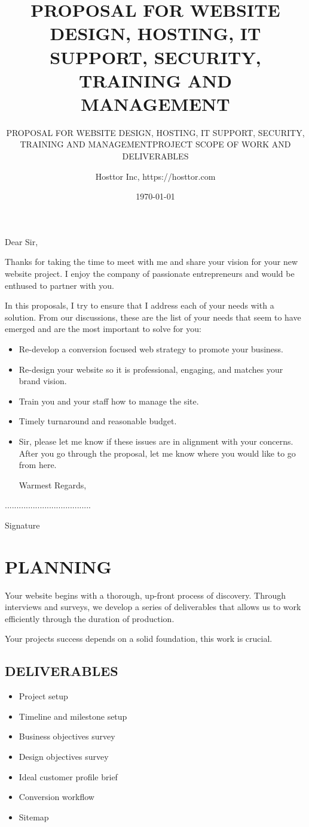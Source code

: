\documentclass[12pt]{report}
\title{PROPOSAL FOR WEBSITE DESIGN, HOSTING, IT SUPPORT, SECURITY, TRAINING AND MANAGEMENT}
\author{Hosttor Inc, https://hosttor.com}
\date{\today}
\begin{document}
\subtitle{PROPOSAL FOR WEBSITE DESIGN, HOSTING, IT SUPPORT, SECURITY, TRAINING AND MANAGEMENT}
\item Dear Sir,
\item Thanks for taking the time to meet with me and share your vision for your new website project. I enjoy the company of passionate entrepreneurs and would be enthused to partner with you.
\item In this proposals, I try to ensure that I address each of your needs with a solution. From our discussions, these are the list of your needs that seem to have emerged and are the most important to solve for you:
\begin{itemize}
\item Re-develop a conversion focused web strategy to promote your business.
\item Re-design your website so it is professional, engaging, and matches your brand vision.
\item Train you and your staff how to manage the site.
\item Timely turnaround and reasonable budget.

\item Sir, please let me know if these issues are in alignment with your concerns. After you go through the proposal, let me know where you would like to go from here.

Warmest Regards,
\end{itemize}

\item ..................................... 
\item Signature
\clearpage

\subtitle{PROJECT SCOPE OF WORK AND DELIVERABLES}
\section{PLANNING}
\item Your website begins with a thorough, up-front process of discovery. Through interviews and surveys, we develop a series of deliverables that allows us to work efficiently through the duration of production.
\item Your projects success depends on a solid foundation, this work is crucial.
\subsection{DELIVERABLES}
\begin{itemize}
\item Project setup
\item Timeline and milestone setup
\item Business objectives survey
\item Design objectives survey
\item Ideal customer profile brief
\item Conversion workflow
\item Sitemap
\end{itemize}
\end{document}
